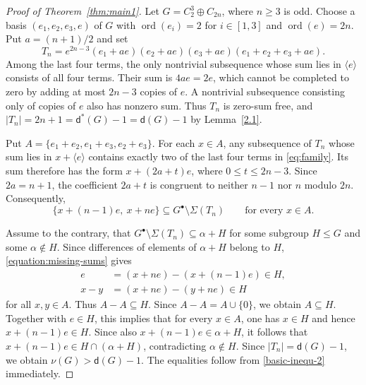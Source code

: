 \documentclass[11pt,a4paper]{amsart}
\theoremstyle{plain}
\theoremstyle{definition}
\newcommand{\dd}{\mathsf d}
\DeclareMathOperator{\ord}{ord}
\begin{document}
\begin{proof}[Proof of Theorem~\ref{thm:main1}]
Let $G=C_2^3\oplus C_{2n}$, where $n\ge3$ is odd.
Choose a basis $(e_1,e_2,e_3,e)$ of $G$ with $\ord(e_i)=2$
for $i \in [1,3]$ and $\ord(e)=2n$. Put $a=(n+1)/2$ and set
\begin{equation}\label{eq:family}
 T_n=e^{2n-3}(e_1+ae)(e_2+ae)(e_3+ae)
 (e_1+e_2+e_3+ae).
\end{equation}
Among the last four terms, the only nontrivial subsequence whose
sum lies in $\langle e\rangle$ consists of all four terms.
Their sum is $4ae=2e$, which cannot be completed to zero by
adding at most $2n-3$ copies of $e$. A nontrivial subsequence
consisting only of copies of $e$ also has nonzero sum.
Thus $T_n$ is zero-sum free, and $|T_n|=2n+1=\mathsf d^* (G)-1=\mathsf d (G)-1$ by Lemma~\ref{2.1}.

Put $A=\{e_1+e_2,e_1+e_3,e_2+e_3\}$. For each $x\in A$,
any subsequence of $T_n$ whose sum lies in $x+\langle e\rangle$
contains exactly two of the last four terms in \eqref{eq:family}.
Its sum therefore has the form $x+(2a+t)e$, where
$0\le t\le2n-3$. Since $2a=n+1$, the coefficient $2a+t$
is congruent to neither $n-1$ nor $n$ modulo $2n$.
Consequently,
\begin{equation}\label{equation:missing-sums}
 \{x+(n-1)e,\ x+ne\}
 \subseteq G^\bullet\setminus\Sigma(T_n)
 \qquad\text{for every }x\in A.
\end{equation}

Assume to the contrary, that
$G^\bullet\setminus\Sigma(T_n)\subseteq\alpha+H$
for some subgroup $H\le G$ and some $\alpha\notin H$.
Since differences of elements of $\alpha+H$ belong to $H$,
\eqref{equation:missing-sums} gives
\begin{align*}
 e   &= (x+ne)-(x+(n-1)e)\in H,\\
 x-y &= (x+ne)-(y+ne)\in H
\end{align*}
for all $x,y\in A$. Thus $A-A\subseteq H$.
Since $A-A=A\cup\{0\}$, we obtain $A\subseteq H$.
Together with $e\in H$, this implies that for every $x\in A$,
one has $x\in H$ and hence $x+(n-1)e\in H$.
Since also $x+(n-1)e\in\alpha+H$, it follows that $x+(n-1)e\in H\cap(\alpha+H)$, contradicting $\alpha\notin H$. Since $|T_n|=\dd(G)-1$, we obtain $\nu(G)>\dd(G)-1$.
The equalities follow from \eqref{basic-inequ-2} immediately.
\end{proof}
\end{document}
